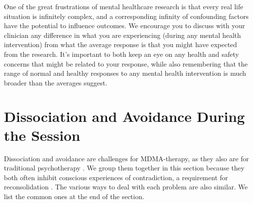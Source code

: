 \documentclass[12pt,letterpaper]{book}
\begin{document}
One of the great frustrations of mental healthcare research is that every real life situation is infinitely complex, and a corresponding infinity of confounding factors have the potential to influence outcomes. We encourage you to discuss with your clinician any difference in what you are experiencing (during any mental health intervention) from what the average response is that you might have expected from the research. It's important to both keep an eye on any health and safety concerns that might be related to your response, while also remembering that the range of normal and healthy responses to any mental health intervention is much broader than the averages suggest.
\section{Dissociation and Avoidance During the Session}
\label{sec:dissociationandresistance}
Dissociation and avoidance are challenges for MDMA-therapy, as they also are for traditional psychotherapy \cite{razviPSIP}. We group them together in this section because they both often inhibit conscious experiences of contradiction, a requirement for reconsolidation \cite{eckerUnlocking,kozlowskaDefenseCascade}. The various ways to deal with each problem are also similar. We list the common ones at the end of the section.
\end{document}
